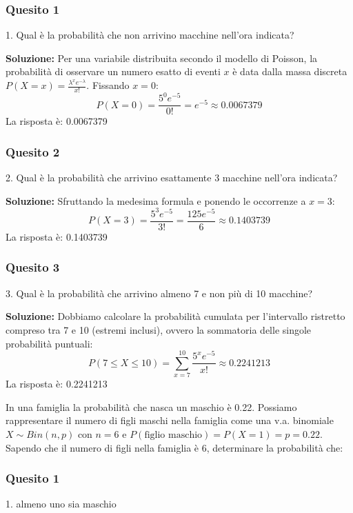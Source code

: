 \documentclass[12pt, a4paper]{article}
\begin{document}
\subsubsection*{Quesito 1}
1. Qual è la probabilità che non arrivino macchine nell’ora indicata?

\textbf{Soluzione:}
Per una variabile distribuita secondo il modello di Poisson, la probabilità di osservare un numero esatto di eventi $x$ è data dalla massa discreta $P(X=x) = \frac{\lambda^x e^{-\lambda}}{x!}$. Fissando $x=0$:
$$ P(X=0) = \frac{5^0 e^{-5}}{0!} = e^{-5} \approx 0.0067379 $$
La risposta è: 0.0067379

\subsubsection*{Quesito 2}
2. Qual è la probabilità che arrivino esattamente 3 macchine nell’ora indicata?

\textbf{Soluzione:}
Sfruttando la medesima formula e ponendo le occorrenze a $x=3$:
$$ P(X=3) = \frac{5^3 e^{-5}}{3!} = \frac{125 e^{-5}}{6} \approx 0.1403739 $$
La risposta è: 0.1403739

\subsubsection*{Quesito 3}
3. Qual è la probabilità che arrivino almeno 7 e non più di 10 macchine?

\textbf{Soluzione:}
Dobbiamo calcolare la probabilità cumulata per l'intervallo ristretto compreso tra 7 e 10 (estremi inclusi), ovvero la sommatoria delle singole probabilità puntuali:
$$ P(7 \leq X \leq 10) = \sum_{x=7}^{10} \frac{5^x e^{-5}}{x!} \approx 0.2241213 $$
La risposta è: 0.2241213


\newpage

\vspace{0.5cm}
\begin{tcolorbox}[colback=lightergray!10, colframe=tocsec, title=\textbf{Esercizio 6}]
In una famiglia la probabilità che nasca un maschio è 0.22. Possiamo rappresentare il numero di figli maschi nella famiglia come una v.a. binomiale $X \sim Bin(n,p)$ con $n=6$ e $P(\text{figlio maschio})=P(X=1)=p=0.22$.
Sapendo che il numero di figli nella famiglia è 6, determinare la probabilità che:
\end{tcolorbox}


\subsubsection*{Quesito 1}
1. almeno uno sia maschio
\end{document}
